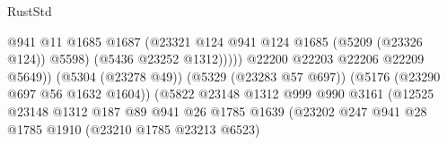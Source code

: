 \begin{lexlean}{RustStd}
\begin{coremodule}
                                                            @941
                                                            @11
                                                            @1685
                                                            @1687
                                                            (@23321
                                                              @124
                                                              @941
                                                              @124
                                                              @1685
                                                              (@5209 (@23326 @124))
                                                              @5598)
                                                            (@5436 @23252 @1312)))))
                                                    @22200
                                                    @22203
                                                    @22206
                                                    @22209
                                                    @5649))
                                                (@5304 (@23278 @49))
                                                (@5329 (@23283 @57 @697))
                                                (@5176 (@23290 @697 @56 @1632 @1604))
                                                (@5822
                                                  @23148
                                                  @1312
                                                  @999
                                                  @990
                                                  @3161
                                                  (@12525
                                                    @23148
                                                    @1312
                                                    @187
                                                    @89
                                                    @941
                                                    @26
                                                    @1785
                                                    @1639
                                                    (@23202
                                                      @247
                                                      @941
                                                      @28
                                                      @1785
                                                      @1910
                                                      (@23210 @1785 @23213 @6523)

\end{coremodule}
\end{lexlean}
